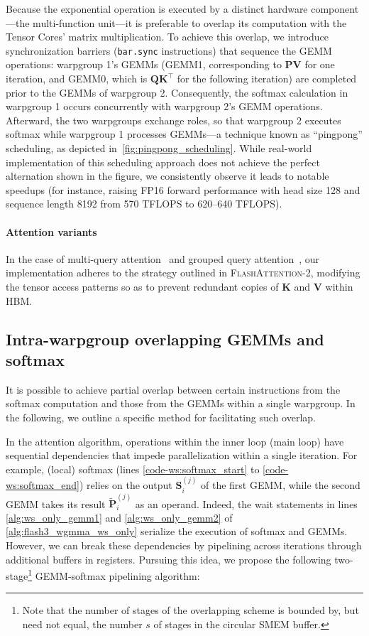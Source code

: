 \begin{enumerate}
Because the exponential operation is executed by a distinct hardware component—the multi-function unit—it is preferable to overlap its computation with the Tensor Cores' matrix multiplication. To achieve this overlap, we introduce synchronization barriers (\texttt{bar.sync} instructions) that sequence the GEMM operations: warpgroup 1's GEMMs (GEMM1, corresponding to $\mathbf{P} \mathbf{V}$ for one iteration, and GEMM0, which is $\mathbf{Q} \mathbf{K}^\top$ for the following iteration) are completed prior to the GEMMs of warpgroup 2. Consequently, the softmax calculation in warpgroup 1 occurs concurrently with warpgroup 2's GEMM operations. Afterward, the two warpgroups exchange roles, so that warpgroup 2 executes softmax while warpgroup 1 processes GEMMs—a technique known as ``pingpong'' scheduling, as depicted in~\cref{fig:pingpong_scheduling}. While real-world implementation of this scheduling approach does not achieve the perfect alternation shown in the figure, we consistently observe it leads to notable speedups (for instance, raising FP16 forward performance with head size 128 and sequence length 8192 from 570 TFLOPS to 620–640 TFLOPS).

\paragraph{Attention variants} In the case of multi-query attention~\citep{shazeer2019fast} and grouped query attention~\citep{ainslie2023gqa}, our implementation adheres to the strategy outlined in \textsc{FlashAttention-2}, modifying the tensor access patterns so as to prevent redundant copies of $\mathbf{K}$ and $\mathbf{V}$ within HBM.

\subsection{Intra-warpgroup overlapping GEMMs and softmax}

It is possible to achieve partial overlap between certain instructions from the softmax computation and those from the GEMMs within a single warpgroup. In the following, we outline a specific method for facilitating such overlap.

In the attention algorithm, operations within the inner loop (main loop) have sequential dependencies that impede parallelization within a single iteration. For example, (local) softmax (lines \ref{code-ws:softmax_start} to \ref{code-ws:softmax_end}) relies on the output $\mathbf{S}_i^{(j)}$ of the first GEMM, while the second GEMM takes its result $\widetilde{\mathbf{P}}_i^{(j)}$ as an operand. Indeed, the wait statements in lines \ref{alg:ws_only_gemm1} and \ref{alg:ws_only_gemm2} of \cref{alg:flash3_wgmma_ws_only} serialize the execution of softmax and GEMMs. However, we can break these dependencies by pipelining across iterations through additional buffers in registers. Pursuing this idea, we propose the following two-stage\footnote{Note that the number of stages of the overlapping scheme is bounded by, but need not equal, the number $s$ of stages in the circular SMEM buffer.} GEMM-softmax pipelining algorithm:


\end{enumerate}
